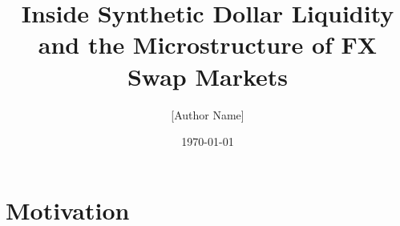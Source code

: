 \documentclass[aspectratio=169, 10pt]{beamer}
\title[FX Swap Microstructure]{Inside Synthetic Dollar Liquidity\\
  and the Microstructure of FX Swap Markets}
\subtitle{}
\author[Author]{[Author Name]}
\institute[Institution]{[University / Institution]}
\date{\today}
\begin{document}

\begin{frame}
  \titlepage
\end{frame}

\section{Motivation}

\end{document}
